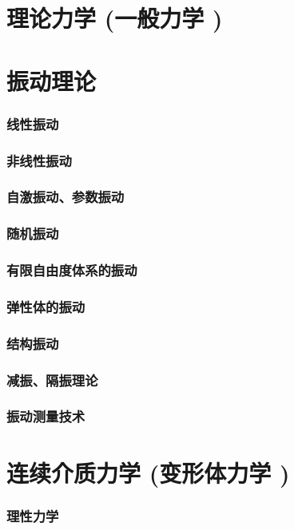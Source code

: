 \documentclass[UTF8]{../06-Physics}
\begin{document}
\chapter{理论力学 (一般力学 )}%




\chapter{振动理论}
    \subsection{线性振动}
    \subsection{非线性振动}
    \subsection{自激振动、参数振动}
    \subsection{随机振动}
    \subsection{有限自由度体系的振动}
    \subsection{弹性体的振动}
    \subsection{结构振动}
    \subsection{减振、隔振理论}
    \subsection{振动测量技术}


\chapter{连续介质力学 (变形体力学 )}
    \subsection{理性力学}
\end{document}
